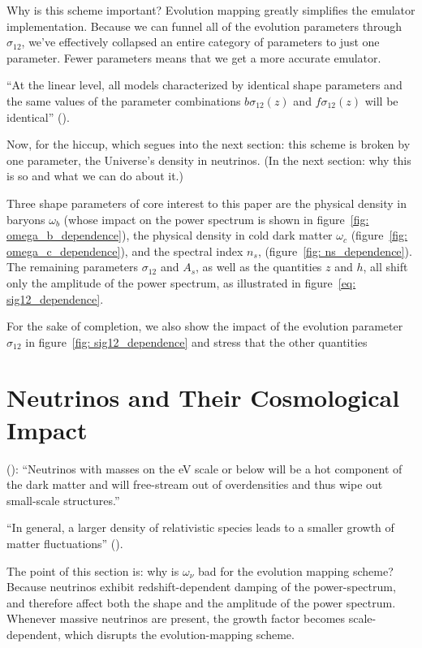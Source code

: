 Why is this scheme important? Evolution mapping greatly simplifies the emulator
implementation. Because we can
funnel all of the evolution parameters through $\sigma_{12}$, we've effectively
collapsed an entire category of parameters to just one parameter. Fewer
parameters means that we get a more accurate emulator.

``At the linear level, all models characterized by identical shape parameters
and the same values of the parameter combinations $b \sigma_{12}(z)$ and
$f \sigma_{12}(z)$ will be identical'' ().

Now, for the hiccup, which segues into the next section: this scheme is broken by one parameter, the Universe's
density in neutrinos. (In the next section: why this is so and what we can do
about it.)


Three shape parameters of core interest to this paper are the physical density in baryons $\omega_b$ (whose impact on the power spectrum is shown in figure~\ref{fig: omega_b_dependence}), the physical density in cold dark matter $\omega_c$ (figure~\ref{fig: omega_c_dependence}), and the spectral index $n_s$, (figure~\ref{fig: ns_dependence}). The remaining parameters $\sigma_{12}$ and $A_s$, as well as the quantities $z$ and $h$, all shift only the amplitude of the power spectrum, as illustrated in figure~\ref{eq: sig12_dependence}. 

For the sake of completion, we also show the impact of the evolution parameter $\sigma_{12}$ in figure~\ref{fig: sig12_dependence} and stress that the other quantities 


\section{Neutrinos and Their Cosmological Impact}

(): ``Neutrinos with masses on the eV scale or below will be a
hot component of the dark matter and will free-stream out of overdensities and
thus wipe out small-scale structures.''

``In general, a larger density of relativistic species leads to a smaller
growth of matter fluctuations'' ().

The point of this section is: why is $\omega_\nu$ bad for the
evolution mapping scheme? Because neutrinos exhibit redshift-dependent
damping of the power-spectrum, and therefore affect both the shape and the
amplitude of the power spectrum. Whenever massive neutrinos are present,
the growth factor becomes scale-dependent, which disrupts the
evolution-mapping scheme.

